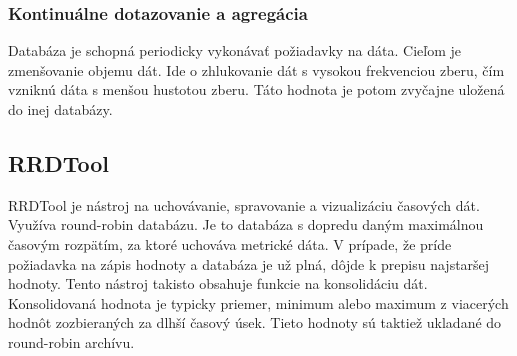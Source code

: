 \documentclass[printed,11pt,twoside,color,cover,table]{fithesis3}
\begin{document}
\subsubsection{Kontinuálne dotazovanie a agregácia}
Databáza je schopná periodicky vykonávať požiadavky na dáta. Cieľom je zmenšovanie objemu dát. Ide o zhlukovanie dát s vysokou frekvenciou zberu, čím vzniknú dáta s menšou hustotou zberu. Táto hodnota je 
potom zvyčajne uložená do inej databázy.

\subsection{RRDTool}
RRDTool je nástroj na uchovávanie, spravovanie a vizualizáciu časových dát. Využíva round-robin databázu. Je to databáza s dopredu daným maximálnou časovým rozpätím, za ktoré uchováva metrické dáta.
V prípade, že príde požiadavka na zápis hodnoty a databáza je už plná, dôjde k prepisu najstaršej hodnoty. Tento nástroj takisto obsahuje funkcie na konsolidáciu dát. 
Konsolidovaná hodnota je typicky priemer, minimum alebo maximum z viacerých hodnôt zozbieraných za dlhší časový úsek. Tieto hodnoty sú taktiež ukladané do round-robin archívu.
\end{document}
